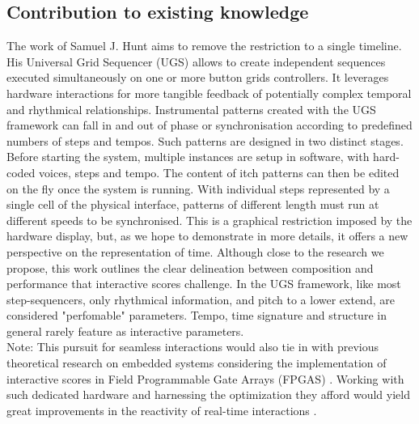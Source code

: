 \documentclass[journal,onecolumn]{IEEEtran}
\begin{document}
\subsection{Contribution to existing knowledge}
The work of Samuel J. Hunt \cite{hunt:poly} aims to remove the restriction to a single timeline. His Universal Grid Sequencer (UGS) allows to create independent sequences executed simultaneously on one or more button grids controllers. It leverages hardware interactions for more tangible feedback of potentially complex temporal and rhythmical relationships. Instrumental patterns created with the UGS framework can fall in and out of phase or synchronisation according to predefined numbers of steps and tempos. Such patterns are designed in two distinct stages. Before starting the system, multiple instances are setup in software, with hard-coded voices, steps and tempo. The content of itch patterns can then be edited on the fly once the system is running. With individual steps represented by a single cell of the physical interface, patterns of different length must run at different speeds to be synchronised. This is a graphical restriction imposed by the hardware display, but, as we hope to demonstrate in more details, it offers a new perspective on the representation of time. Although close to the research we propose, this work outlines the clear delineation between composition and performance that interactive scores challenge. In the UGS framework, like most step-sequencers, only rhythmical information, and pitch to a lower extend, are considered "perfomable" parameters. Tempo, time signature and structure in general rarely feature as interactive parameters. 
\\

Note: This pursuit for seamless interactions would also tie in with previous theoretical research on embedded systems considering the implementation of interactive scores in Field Programmable Gate Arrays (FPGAS) \cite{arias:fpga}. Working with such dedicated hardware and harnessing the optimization they afford would yield great improvements in the reactivity of real-time interactions \cite{popoff:fpga}. 

\end{document}
